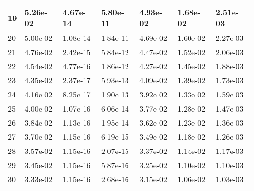 \documentclass[soc]{gzwroc} %
\begin{document}
\begin{table}[h!]
\begin{tabular}{|l|l|l|l|l|l|l|}
19 & 5.26e-02 & 4.67e-14 & 5.80e-11 & 4.93e-02 & 1.68e-02 & 2.51e-03 \\ \hline 
20 & 5.00e-02 & 1.08e-14 & 1.84e-11 & 4.69e-02 & 1.60e-02 & 2.27e-03 \\ \hline 
21 & 4.76e-02 & 2.42e-15 & 5.84e-12 & 4.47e-02 & 1.52e-02 & 2.06e-03 \\ \hline 
22 & 4.54e-02 & 4.77e-16 & 1.86e-12 & 4.27e-02 & 1.45e-02 & 1.88e-03 \\ \hline 
23 & 4.35e-02 & 2.37e-17 & 5.93e-13 & 4.09e-02 & 1.39e-02 & 1.73e-03 \\ \hline 
24 & 4.16e-02 & 8.25e-17 & 1.90e-13 & 3.92e-02 & 1.33e-02 & 1.59e-03 \\ \hline 
25 & 4.00e-02 & 1.07e-16 & 6.06e-14 & 3.77e-02 & 1.28e-02 & 1.47e-03 \\ \hline 
26 & 3.84e-02 & 1.13e-16 & 1.95e-14 & 3.62e-02 & 1.23e-02 & 1.36e-03 \\ \hline 
27 & 3.70e-02 & 1.15e-16 & 6.19e-15 & 3.49e-02 & 1.18e-02 & 1.26e-03 \\ \hline 
28 & 3.57e-02 & 1.15e-16 & 2.07e-15 & 3.37e-02 & 1.14e-02 & 1.17e-03 \\ \hline 
29 & 3.45e-02 & 1.15e-16 & 5.87e-16 & 3.25e-02 & 1.10e-02 & 1.10e-03 \\ \hline 
30 & 3.33e-02 & 1.15e-16 & 2.68e-16 & 3.15e-02 & 1.06e-02 & 1.03e-03 \\ \hline 
\end{tabular}
\end{table}
\end{document}
